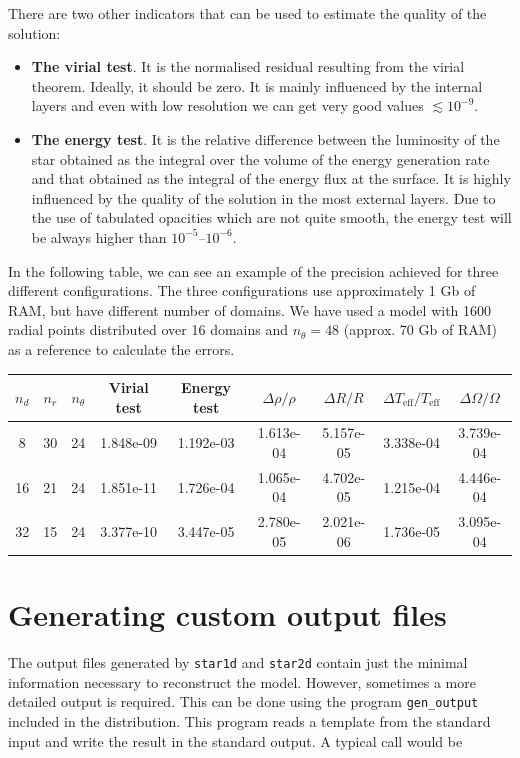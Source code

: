 \pagebreak

There are two other indicators that can be used to estimate the quality of the solution:
\begin{itemize}
\item {\bf The virial test}. It is the normalised residual resulting from the virial theorem.
Ideally, it should be zero. It is mainly influenced by the internal layers and even with
low resolution we can get very good values $\lesssim10^{-9}$.
\item {\bf The energy test}. It is the relative difference between the luminosity of the star
obtained as the integral over the volume of the energy generation rate and that obtained
as the integral of the energy flux at the surface. It is highly influenced by the quality
of the solution in the most external layers. Due to the use of tabulated opacities which are not
quite smooth, the energy test will be always higher than $10^{-5}$--$10^{-6}$. 
\end{itemize}

In the following table, we can see an example of the precision achieved for three different
configurations. The three configurations use approximately 1 Gb of RAM, but have different
number of domains. We have used a model with 1600 radial points distributed over 16 domains
and $n_\theta=48$ (approx. 70 Gb of RAM) as a reference to calculate the errors.

\begin{center}
\begin{tabular}{c|c|c||c|c|c|c|c|c}
$n_d$ & $n_r$ & $n_\theta$ & Virial test & Energy test &
$\Delta\rho/\rho$ & $\Delta R/R$ & $\Delta T_\mathrm{eff}/T_\mathrm{eff}$ & $\Delta \Omega/\Omega$ \\
\hline
8 & 30 & 24 & 1.848e-09 & 1.192e-03 & 
1.613e-04 & 5.157e-05 & 3.338e-04 & 3.739e-04 \\
16 & 21 & 24 & 1.851e-11 & 1.726e-04 &
1.065e-04 & 4.702e-05 & 1.215e-04 & 4.446e-04 \\
32 & 15 & 24 & 3.377e-10 & 3.447e-05 &
2.780e-05 & 2.021e-06 & 1.736e-05 & 3.095e-04 \\
\end{tabular}
\end{center}

\section{Generating custom output files}

The output files generated by {\tt star1d} and {\tt star2d} contain just
the minimal information necessary to reconstruct the model. However,
sometimes a more detailed output is required.  This can be done using
the program {\tt gen\_output} included in the distribution. This program
reads a template from the standard input and write the result in the
standard output.  A typical call would be

